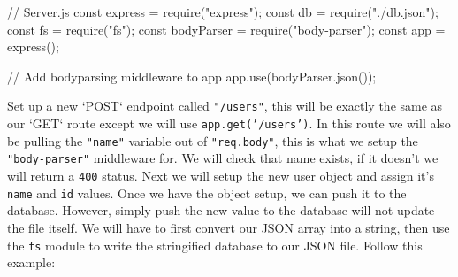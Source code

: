 \documentclass{42-en}
\begin{document}
\begin{42jscode}
    // Server.js
    const express = require("express");
    const db = require("./db.json");
    const fs = require("fs");
    const bodyParser = require("body-parser");
    const app = express();

    // Add bodyparsing middleware to app
    app.use(bodyParser.json());
\end{42jscode}
\newpage
    Set up a new `POST` endpoint called \texttt{"/users"}, this will be exactly the same as our `GET` route except we will use \texttt{app.get('/users')}. In this route we will also be pulling the \texttt{"name"} variable out of \texttt{"req.body"}, this is what we setup the \texttt{"body-parser"} middleware for. We will check that name exists, if it doesn't we will return a \texttt{400} status. Next we will setup the new user object and assign it's \texttt{name} and \texttt{id} values. Once we have the object setup, we can push it to the database. However, simply push the new value to the database will not update the file itself. We will have to first convert our JSON array into a string, then use the \texttt{fs} module to write the stringified database to our JSON file. Follow this example:



\newpage
\nextexercice


\end{document}
